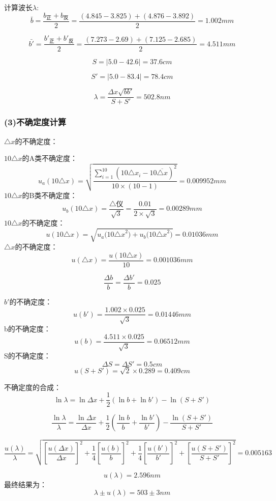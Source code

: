 \documentclass[11pt,a4paper,oneside]{article}
\begin{document}
计算波长$\lambda$:
$$\bar{b} = \displaystyle\frac{b_\text{正}+b_\text{反}}{2} = \displaystyle\frac{ (4.845-3.825)+(4.876-3.892)}{2} = 1.002mm$$

$$\bar{b'} = \displaystyle\frac{b'_\text{正}+b'_\text{反}}{2} = \displaystyle\frac{ (7.273-2.69)+(7.125-2.685)}{2} = 4.511mm$$

$$ S ={\mid} 5.0 - 42.6 {\mid}= 37.6cm$$

$$ S' ={\mid} 5.0 - 83.4 {\mid}= 78.4cm$$

$$ {\lambda} = \displaystyle\frac{{\Delta}x\sqrt{bb'}}{S+S'} = 502.8nm$$

\subsubsection*{(3)不确定度计算}
${\triangle}x$的不确定度：

$10{\triangle}x$的A类不确定度：
$$u_a(10{\triangle}x) = \sqrt{\displaystyle\frac{\sum\limits_{i=1}^{10} (10{{\triangle}x}_i-{10\overline{{\triangle}x}})^2}{10{\times}(10-1)}} = 0.009952mm$$
$10{\triangle}x$的B类不确定度：
$$u_b({10{\triangle}x})=\displaystyle\frac{\bigtriangleup\text{仪}}{\sqrt{3}}
= \frac{0.01}{2{\times}\sqrt{3}} = 0.00289mm$$
$10{\triangle}x$的不确定度：
$$u(10{\triangle}x)=\sqrt{{u_a(10{\triangle}x}^2)+{u_b(10{\triangle}x}^2)} = 0.01036mm$$
${\triangle}x$的不确定度：
$$u({\triangle}x) = \displaystyle\frac{u(10{\triangle}x)}{10} = 0.001036mm$$

$$ \displaystyle\frac{{\Delta}b}{b} = \displaystyle\frac{{\Delta}b'}{b} = 0.025 $$

$b'$的不确定度：
$$ u(b') = \displaystyle\frac{ 1.002{\times}0.025}{\sqrt{3}} =0.01446mm$$
b的不确定度：
$$ u(b) = \displaystyle\frac{ 4.511{\times}0.025}{\sqrt{3}} =0.06512mm$$
S的不确定度：
$${\Delta}S = {\Delta}S' = 0.5cm$$
$$ u(S+S') = \sqrt{2} {\times} 0.289 = 0.409cm$$

不确定度的合成：
$$ \ln{\lambda} = \ln{{\Delta}x}+ \displaystyle\frac{1}{2}(\ln{b}+\ln{b'}) - \ln(S+S')$$

$$\displaystyle\frac{\ln{\lambda}}{\lambda} = \displaystyle\frac{\ln{\Delta}x}{{\Delta}x}+\displaystyle\frac{1}{2}(\displaystyle\frac{\ln{b}}{b}+\displaystyle\frac{\ln{b'}}{b'}) - \displaystyle\frac{\ln{(S+S')}}{S+S'} $$

$$\displaystyle\frac{u({\lambda})}{\lambda} = \sqrt{ [{\frac{u({\Delta}x)}{{\Delta}x}}]^2+\frac{1}{4}[{\frac{u(b)}{b}}]^2 +\frac{1}{4}[{\frac{u(b')}{b'}}]^2 + [\frac{u(S+S')}{S+S'}]^2   } = 0.005163$$

$$ u({\lambda}) = 2.596 nm$$
最终结果为：
$$ {\lambda}{\pm}{u({\lambda})} = 503 {\pm} 3 nm $$
\end{document}
